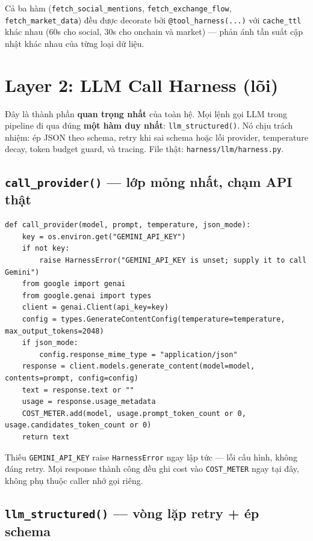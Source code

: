 \documentclass[12pt,a4paper]{article}
\newcommand{\file}[1]{\texttt{#1}}
\begin{document}
Cả ba hàm (\texttt{fetch\_social\_mentions}, \texttt{fetch\_exchange\_flow},
\texttt{fetch\_market\_data}) đều được decorate bởi \texttt{@tool\_harness(...)} với
\texttt{cache\_ttl} khác nhau (60s cho social, 30s cho onchain và market) --- phản ánh tần suất
cập nhật khác nhau của từng loại dữ liệu.

\section{Layer 2: LLM Call Harness (lõi)}

Đây là thành phần \textbf{quan trọng nhất} của toàn hệ. Mọi lệnh gọi LLM trong pipeline đi qua
đúng \textbf{một hàm duy nhất}: \texttt{llm\_structured()}. Nó chịu trách nhiệm: ép JSON theo
schema, retry khi sai schema hoặc lỗi provider, temperature decay, token budget guard, và tracing.
File thật: \file{harness/llm/harness.py}.

\subsection*{\texttt{call\_provider()} --- lớp mỏng nhất, chạm API thật}

\begin{lstlisting}
def call_provider(model, prompt, temperature, json_mode):
    key = os.environ.get("GEMINI_API_KEY")
    if not key:
        raise HarnessError("GEMINI_API_KEY is unset; supply it to call Gemini")
    from google import genai
    from google.genai import types
    client = genai.Client(api_key=key)
    config = types.GenerateContentConfig(temperature=temperature, max_output_tokens=2048)
    if json_mode:
        config.response_mime_type = "application/json"
    response = client.models.generate_content(model=model, contents=prompt, config=config)
    text = response.text or ""
    usage = response.usage_metadata
    COST_METER.add(model, usage.prompt_token_count or 0, usage.candidates_token_count or 0)
    return text
\end{lstlisting}

Thiếu \texttt{GEMINI\_API\_KEY} raise \texttt{HarnessError} ngay lập tức --- lỗi cấu hình, không
đáng retry. Mọi response thành công đều ghi cost vào \texttt{COST\_METER} ngay tại đây, không phụ
thuộc caller nhớ gọi riêng.

\subsection*{\texttt{llm\_structured()} --- vòng lặp retry + ép schema}
\end{document}
